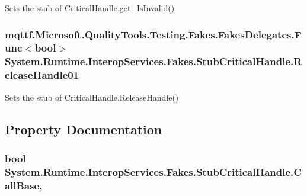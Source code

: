 Sets the stub of Critical\-Handle.\-get\-\_\-\-Is\-Invalid()

\hypertarget{class_system_1_1_runtime_1_1_interop_services_1_1_fakes_1_1_stub_critical_handle_ad2a22e2ee8c74f70fb264ff1d89ed4bb}{
\subsubsection[{Release\-Handle01}]{\setlength{\rightskip}{0pt plus 5cm}mqttf.\-Microsoft.\-Quality\-Tools.\-Testing.\-Fakes.\-Fakes\-Delegates.\-Func$<$bool$>$ System.\-Runtime.\-Interop\-Services.\-Fakes.\-Stub\-Critical\-Handle.\-Release\-Handle01}}\label{class_system_1_1_runtime_1_1_interop_services_1_1_fakes_1_1_stub_critical_handle_ad2a22e2ee8c74f70fb264ff1d89ed4bb}


Sets the stub of Critical\-Handle.\-Release\-Handle()



\subsection{Property Documentation}
\hypertarget{class_system_1_1_runtime_1_1_interop_services_1_1_fakes_1_1_stub_critical_handle_aa9a0b569c6292ff13e217b0a3a24e45d}{
\subsubsection[{Call\-Base}]{\setlength{\rightskip}{0pt plus 5cm}bool System.\-Runtime.\-Interop\-Services.\-Fakes.\-Stub\-Critical\-Handle.\-Call\-Base\hspace{0.3cm}{\ttfamily [get]}, {\ttfamily [set]}}}\label{class_system_1_1_runtime_1_1_interop_services_1_1_fakes_1_1_stub_critical_handle_aa9a0b569c6292ff13e217b0a3a24e45d}


